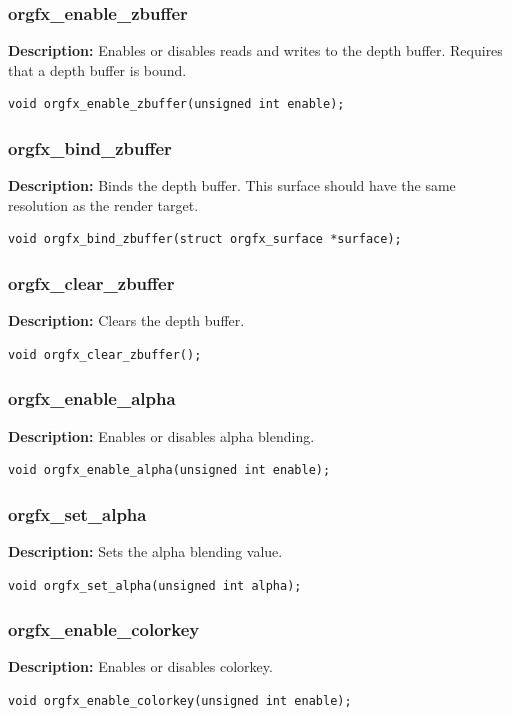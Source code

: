 \documentclass[10pt,a4paper]{article}
\begin{document}
\subsubsection{orgfx\_enable\_zbuffer}
\textbf{Description:} Enables or disables reads and writes to the depth buffer. Requires that a depth buffer is bound.
\begin{lstlisting}
void orgfx_enable_zbuffer(unsigned int enable);
\end{lstlisting}

\subsubsection{orgfx\_bind\_zbuffer}
\textbf{Description:} Binds the depth buffer. This surface should have the same resolution as the render target.
\begin{lstlisting}
void orgfx_bind_zbuffer(struct orgfx_surface *surface);
\end{lstlisting}

\subsubsection{orgfx\_clear\_zbuffer}
\textbf{Description:} Clears the depth buffer.
\begin{lstlisting}
void orgfx_clear_zbuffer();
\end{lstlisting}

\subsubsection{orgfx\_enable\_alpha}
\textbf{Description:} Enables or disables alpha blending.
\begin{lstlisting}
void orgfx_enable_alpha(unsigned int enable);
\end{lstlisting}

\subsubsection{orgfx\_set\_alpha}
\textbf{Description:} Sets the alpha blending value.
\begin{lstlisting}
void orgfx_set_alpha(unsigned int alpha);
\end{lstlisting}

\subsubsection{orgfx\_enable\_colorkey}
\textbf{Description:} Enables or disables colorkey.
\begin{lstlisting}
void orgfx_enable_colorkey(unsigned int enable);
\end{lstlisting}
\end{document}
